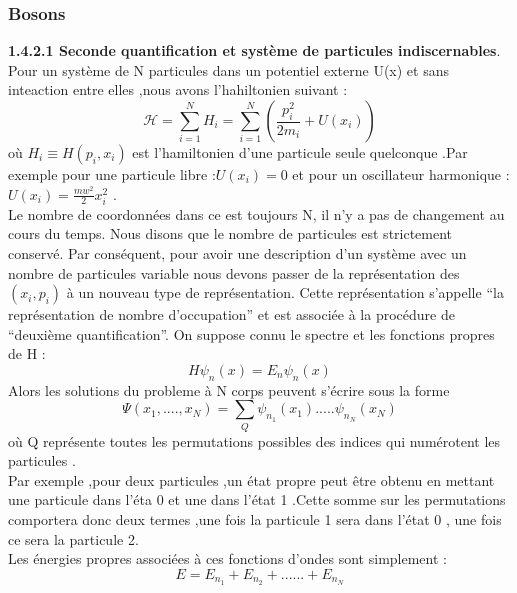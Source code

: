 \documentclass[12pt,a4paper, openany]{article}
\begin{document}
\subsubsection{Bosons}
 \textbf{1.4.2.1 Seconde quantification et système de particules indiscernables}.\\

\hspace{0.5cm}Pour un système de N particules dans un potentiel externe U(x) et sans inteaction entre elles ,nous avons l'hahiltonien suivant :
\begin{equation}
\mathcal{H}=\sum_{i=1}^{N}H_i=\sum_{i=1}^{N}(\frac{p_i^2}{2m_i}+U(x_i))
\end{equation}
où $H_i\equiv H(p_i,x_i)$ est l'hamiltonien d'une particule seule quelconque .Par exemple pour une particule libre :$U(x_i)=0$ et pour un oscillateur harmonique :$U(x_i)=\frac{mw^2}{2}x_i^2$ . \\

\hspace{0.5cm}Le nombre de coordonnées dans ce est toujours N, il n’y a pas de changement au cours du temps. Nous disons que le nombre de particules est strictement conservé. Par conséquent, pour avoir une description d’un système avec un nombre de particules variable nous devons passer de la représentation des $ (x_i,p_i)$ à un nouveau type de représentation. Cette représentation s’appelle “la représentation de nombre d’occupation” et est associée à la procédure de “deuxième quantiﬁcation”.
 On suppose connu le spectre et les fonctions propres de H :
\begin{equation}
	H{\psi}_n(x)=E_n{\psi_n(x)}
\end{equation}
Alors les solutions du probleme à N corps peuvent s'écrire sous la forme 
\begin{equation}
	\Psi(x_1,....,x_N)=\sum_{Q}{\psi}_{n_1}(x_1).....{\psi}_{n_N}(x_N)
\end{equation}
où Q représente toutes les permutations possibles des indices qui numérotent les particules .\\
Par exemple ,pour deux particules ,un état propre peut \^{e}tre obtenu en mettant une particule dans l'éta 0 et une dans l'état 1 .Cette somme sur les permutations comportera donc deux termes ,une fois la particule 1 sera dans l'état 0 , une fois ce sera la particule 2.\\

\hspace{0.3cm}Les énergies propres associées à ces fonctions d'ondes sont simplement : 
\begin{equation}
E=E_{n_1}+E_{n_2}+......+E_{n_N}
\end{equation}
\end{document}
